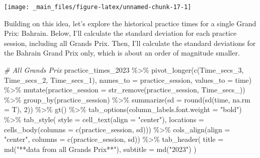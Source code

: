 \documentclass[
]{book}
\newenvironment{Shaded}{\begin{snugshade}}{\end{snugshade}}
\newcommand{\AttributeTok}[1]{\textcolor[rgb]{0.77,0.63,0.00}{#1}}
\newcommand{\CommentTok}[1]{\textcolor[rgb]{0.56,0.35,0.01}{\textit{#1}}}
\newcommand{\DecValTok}[1]{\textcolor[rgb]{0.00,0.00,0.81}{#1}}
\newcommand{\FunctionTok}[1]{\textcolor[rgb]{0.00,0.00,0.00}{#1}}
\newcommand{\NormalTok}[1]{#1}
\newcommand{\SpecialCharTok}[1]{\textcolor[rgb]{0.00,0.00,0.00}{#1}}
\newcommand{\StringTok}[1]{\textcolor[rgb]{0.31,0.60,0.02}{#1}}
\begin{document}
\begin{center}\texttt{[image: \_main\_files/figure-latex/unnamed-chunk-17-1]} \end{center}

Building on this idea, let's explore the historical practice times for a single Grand Prix: Bahrain. Below, I'll calculate the standard deviation for each practice session, including all Grands Prix. Then, I'll calculate the standard deviations for the Bahrain Grand Prix only, which is about an order of magnitude smaller.

\begin{Shaded}
\begin{Highlighting}[]
\CommentTok{\# All Grands Prix}
\NormalTok{practice\_times\_2023 }\SpecialCharTok{\%\textgreater{}\%}
  \FunctionTok{pivot\_longer}\NormalTok{(}\FunctionTok{c}\NormalTok{(Time\_secs\_3, Time\_secs\_2, Time\_secs\_1), }\AttributeTok{names\_to =} \StringTok{\textquotesingle{}practice\_session\textquotesingle{}}\NormalTok{, }\AttributeTok{values\_to =} \StringTok{\textquotesingle{}time\textquotesingle{}}\NormalTok{) }\SpecialCharTok{\%\textgreater{}\%}
  \FunctionTok{mutate}\NormalTok{(}\AttributeTok{practice\_session =} \FunctionTok{str\_remove}\NormalTok{(practice\_session, }\StringTok{\textquotesingle{}Time\_secs\_\textquotesingle{}}\NormalTok{)) }\SpecialCharTok{\%\textgreater{}\%}
  \FunctionTok{group\_by}\NormalTok{(practice\_session) }\SpecialCharTok{\%\textgreater{}\%} 
  \FunctionTok{summarize}\NormalTok{(}\AttributeTok{sd =} \FunctionTok{round}\NormalTok{(}\FunctionTok{sd}\NormalTok{(time, }\AttributeTok{na.rm =}\NormalTok{ T), }\DecValTok{2}\NormalTok{)) }\SpecialCharTok{\%\textgreater{}\%}
  \FunctionTok{gt}\NormalTok{() }\SpecialCharTok{\%\textgreater{}\%}
  \FunctionTok{tab\_options}\NormalTok{(}\AttributeTok{column\_labels.font.weight =} \StringTok{"bold"}\NormalTok{) }\SpecialCharTok{\%\textgreater{}\%}
  \FunctionTok{tab\_style}\NormalTok{(}
    \AttributeTok{style =} \FunctionTok{cell\_text}\NormalTok{(}\AttributeTok{align =} \StringTok{"center"}\NormalTok{),}
    \AttributeTok{locations =} \FunctionTok{cells\_body}\NormalTok{(}\AttributeTok{columns =} \FunctionTok{c}\NormalTok{(practice\_session, sd))) }\SpecialCharTok{\%\textgreater{}\%}
  \FunctionTok{cols\_align}\NormalTok{(}\AttributeTok{align =} \StringTok{"center"}\NormalTok{, }\AttributeTok{columns =} \FunctionTok{c}\NormalTok{(practice\_session, sd)) }\SpecialCharTok{\%\textgreater{}\%} 
  \FunctionTok{tab\_header}\NormalTok{(}
    \AttributeTok{title =} \FunctionTok{md}\NormalTok{(}\StringTok{"**data from all Grands Prix**"}\NormalTok{),}
    \AttributeTok{subtitle =} \FunctionTok{md}\NormalTok{(}\StringTok{"2023"}\NormalTok{)}
\NormalTok{  )}
\end{Highlighting}
\end{Shaded}
\end{document}
